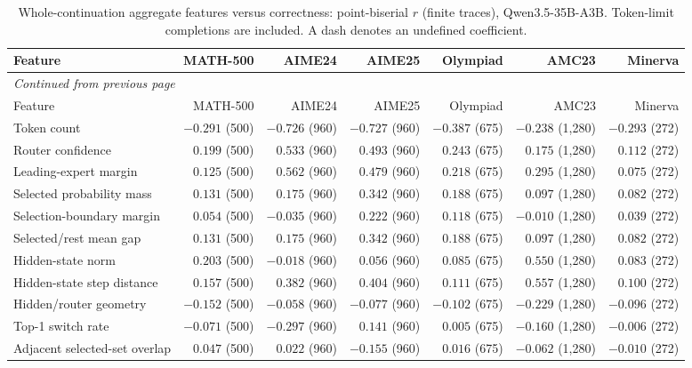 \begingroup\scriptsize\setlength{\tabcolsep}{4pt}
\begin{longtable}{@{}lrrrrrr@{}}
\caption{Whole-continuation aggregate features versus correctness: point-biserial $r$ (finite traces), Qwen3.5-35B-A3B. Token-limit completions are included. A dash denotes an undefined coefficient.}\label{tab:qwen-corr-correct}\\
\toprule
Feature & MATH-500 & AIME24 & AIME25 & Olympiad & AMC23 & Minerva \\
\midrule\endfirsthead
\multicolumn{7}{l}{\textit{Continued from previous page}}\\
\toprule
Feature & MATH-500 & AIME24 & AIME25 & Olympiad & AMC23 & Minerva \\
\midrule\endhead
\bottomrule\endfoot
Token count & $-0.291$ (500) & $-0.726$ (960) & $-0.727$ (960) & $-0.387$ (675) & $-0.238$ (1,280) & $-0.293$ (272) \\
Router confidence & $0.199$ (500) & $0.533$ (960) & $0.493$ (960) & $0.243$ (675) & $0.175$ (1,280) & $0.112$ (272) \\
Leading-expert margin & $0.125$ (500) & $0.562$ (960) & $0.479$ (960) & $0.218$ (675) & $0.295$ (1,280) & $0.075$ (272) \\
Selected probability mass & $0.131$ (500) & $0.175$ (960) & $0.342$ (960) & $0.188$ (675) & $0.097$ (1,280) & $0.082$ (272) \\
Selection-boundary margin & $0.054$ (500) & $-0.035$ (960) & $0.222$ (960) & $0.118$ (675) & $-0.010$ (1,280) & $0.039$ (272) \\
Selected/rest mean gap & $0.131$ (500) & $0.175$ (960) & $0.342$ (960) & $0.188$ (675) & $0.097$ (1,280) & $0.082$ (272) \\
Hidden-state norm & $0.203$ (500) & $-0.018$ (960) & $0.056$ (960) & $0.085$ (675) & $0.550$ (1,280) & $0.083$ (272) \\
Hidden-state step distance & $0.157$ (500) & $0.382$ (960) & $0.404$ (960) & $0.111$ (675) & $0.557$ (1,280) & $0.100$ (272) \\
Hidden/router geometry & $-0.152$ (500) & $-0.058$ (960) & $-0.077$ (960) & $-0.102$ (675) & $-0.229$ (1,280) & $-0.096$ (272) \\
Top-1 switch rate & $-0.071$ (500) & $-0.297$ (960) & $0.141$ (960) & $0.005$ (675) & $-0.160$ (1,280) & $-0.006$ (272) \\
Adjacent selected-set overlap & $0.047$ (500) & $0.022$ (960) & $-0.155$ (960) & $0.016$ (675) & $-0.062$ (1,280) & $-0.010$ (272) \\
\end{longtable}\endgroup
